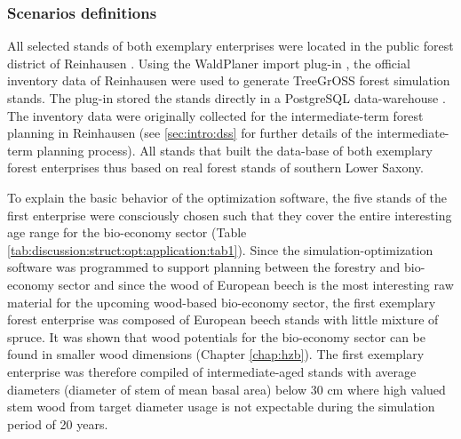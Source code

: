 \subsubsection{Scenarios definitions}
\label{subsubsec:discussion:struct:opt:application:method}
All selected stands of both exemplary enterprises were located in the public forest district of Reinhausen \citep{nlf_2017}. Using the WaldPlaner import plug-in \citep[p. 58]{hansen_2014}, the official inventory data of Reinhausen were used to generate TreeGrOSS forest simulation stands. The plug-in stored the stands directly in a PostgreSQL data-warehouse \citep{eisentraut_2003}. The inventory data were originally collected for the intermediate-term forest planning in Reinhausen (see \ref{sec:intro:dss} for further details of the intermediate-term planning process). All stands that built the data-base of both exemplary forest enterprises thus based on real forest stands of southern Lower Saxony.

To explain the basic behavior of the optimization software, the five stands of the first enterprise were consciously chosen such that they cover the entire interesting age range for the bio-economy sector (Table \ref{tab:discussion:struct:opt:application:tab1}). Since the simulation-optimization software was programmed to support planning between the forestry and bio-economy sector and since the wood of European beech is the most interesting raw material for the upcoming wood-based bio-economy sector, the first exemplary forest enterprise was composed of European beech stands with little mixture of spruce. It was shown that wood potentials for the bio-economy sector can be found in smaller wood dimensions (Chapter \ref{chap:hzb}). The first exemplary enterprise was therefore compiled of intermediate-aged stands with average diameters (diameter of stem of mean basal area) below 30 cm where high valued stem wood from target diameter usage is not expectable during the simulation period of 20 years.

